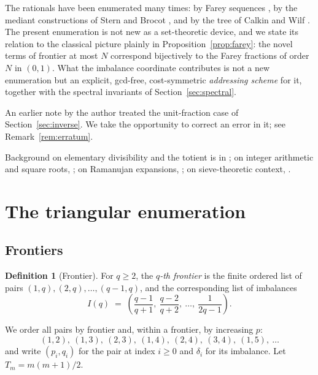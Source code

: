 \documentclass[11pt,a4paper]{article}
\theoremstyle{plain}
\theoremstyle{definition}
\newtheorem{definition}[theorem]{Definition}
\theoremstyle{remark}
\begin{document}
The rationals have been enumerated many times: by Farey sequences
\cite{Farey1816}, by the mediant constructions of Stern \cite{Stern1858} and
Brocot \cite{Brocot1861}, and by the tree of Calkin and Wilf \cite{CalkinWilf2000}.
The present enumeration is not new as a set-theoretic device, and we state its
relation to the classical picture plainly in Proposition~\ref{prop:farey}: the
novel terms of frontier at most $N$ correspond bijectively to the Farey
fractions of order $N$ in $(0,1)$. What the imbalance coordinate contributes is
not a new enumeration but an explicit, gcd-free, cost-symmetric \emph{addressing
scheme} for it, together with the spectral invariants of
Section~\ref{sec:spectral}.

An earlier note by the author \cite{Bilokon2025} treated the unit-fraction case
of Section~\ref{sec:inverse}. We take the opportunity to correct an error in it;
see Remark~\ref{rem:erratum}.

Background on elementary divisibility and the totient is in
\cite{Apostol1976,HardyWright2008}; on integer arithmetic and square roots,
\cite{BrentZimmermann2021}; on Ramanujan expansions,
\cite{Ramanujan1918,Schwarz1994}; on sieve-theoretic context,
\cite{IwaniecKowalski2004}.

\section{The triangular enumeration}
\label{sec:index}

\subsection{Frontiers}

\begin{definition}[Frontier]
For $q \ge 2$, the \emph{$q$-th frontier} is the finite ordered list of pairs
$(1,q), (2,q), \dots, (q-1,q)$, and the corresponding list of imbalances
\[
  I(q) \;=\; \left( \frac{q-1}{q+1},\ \frac{q-2}{q+2},\ \dots,\ \frac{1}{2q-1} \right).
\]
\end{definition}

We order all pairs by frontier and, within a frontier, by increasing $p$:
\begin{equation}\label{eq:order}
  (1,2),\ (1,3),\ (2,3),\ (1,4),\ (2,4),\ (3,4),\ (1,5),\ \dots
\end{equation}
and write $(p_i,q_i)$ for the pair at index $i \ge 0$ and $\delta_i$ for its
imbalance. Let $T_m = m(m+1)/2$.
\end{document}
